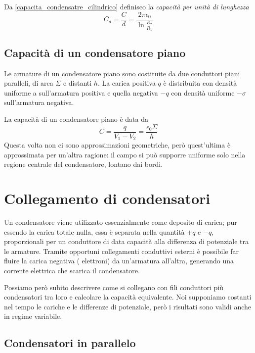 \documentclass[class=book, crop=false, oneside, 12pt]{standalone}
\begin{document}
Da \ref{capacita_condensatre_cilindrico} definisco la \emph{capacità per unità di lunghezza}
\begin{equation}
    C_d = \frac{C}{d} = \frac{2 \pi \epsilon_0}{\ln \frac{R_2}{R_1}}
\end{equation}

\subsection{Capacità di un condensatore piano}

Le armature di un condensatore piano sono costituite da due conduttori piani paralleli, di area \(\Sigma\) e distanti \(h\).
La carica positiva \(q\) è distribuita con densità uniforme a sull'armatura positiva e quella negativa \(- q\) con densità uniforme \(-\sigma\) sull'armatura negativa. 

La capacità di un condensatore piano è data da 
\begin{equation}
    C = \frac{q}{V_1 - V_2} = \frac{\epsilon_0 \Sigma}{h}
\end{equation}
Questa volta non ci sono approssimazioni geometriche, però quest'ultima è approssimata per un'altra ragione: il campo si può supporre uniforme solo nella regione centrale del condensatore, lontano dai bordi.

\section{Collegamento di condensatori}

Un condensatore viene utilizzato essenzialmente come deposito di carica; pur essendo la carica totale nulla, essa è separata nella quantità \(+q\) e \(-q\), proporzionali per un conduttore di data capacità alla differenza di potenziale tra le armature.
Tramite opportuni collegamenti conduttivi esterni è possibile far fluire la carica negativa ( elettroni) da un'armatura all'altra, generando una corrente elettrica che scarica il condensatore. 

Possiamo però subito descrivere come si collegano con fili conduttori più condensatori tra loro e calcolare la capacità equivalente. 
Noi supponiamo costanti nel tempo le cariche e le differenze di potenziale, però i risultati sono validi anche in regime variabile.

\subsection{Condensatori in parallelo}
\end{document}
